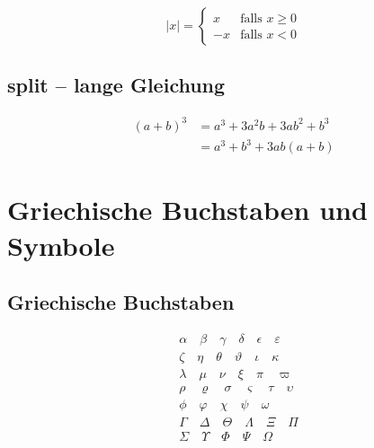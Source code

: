 \begin{equation}
    |x| = \begin{cases}
        x & \text{falls } x \geq 0 \\
        -x & \text{falls } x < 0
    \end{cases}
    \label{eq:absolut}
\end{equation}

\section{split -- lange Gleichung}

\begin{equation}
    \begin{split}
        (a+b)^3 &= a^3 + 3a^2b + 3ab^2 + b^3 \\
                 &= a^3 + b^3 + 3ab(a+b)
    \end{split}
    \label{eq:binom3d}
\end{equation}

\chapter{Griechische Buchstaben und Symbole}
\label{sec:symbole}

\section{Griechische Buchstaben}

\begin{align*}
    &\alpha \quad \beta \quad \gamma \quad \delta \quad \epsilon \quad \varepsilon \\
    &\zeta \quad \eta \quad \theta \quad \vartheta \quad \iota \quad \kappa \\
    &\lambda \quad \mu \quad \nu \quad \xi \quad \pi \quad \varpi \\
    &\rho \quad \varrho \quad \sigma \quad \varsigma \quad \tau \quad \upsilon \\
    &\phi \quad \varphi \quad \chi \quad \psi \quad \omega \\
    &\Gamma \quad \Delta \quad \Theta \quad \Lambda \quad \Xi \quad \Pi \\
    &\Sigma \quad \Upsilon \quad \Phi \quad \Psi \quad \Omega
\end{align*}

